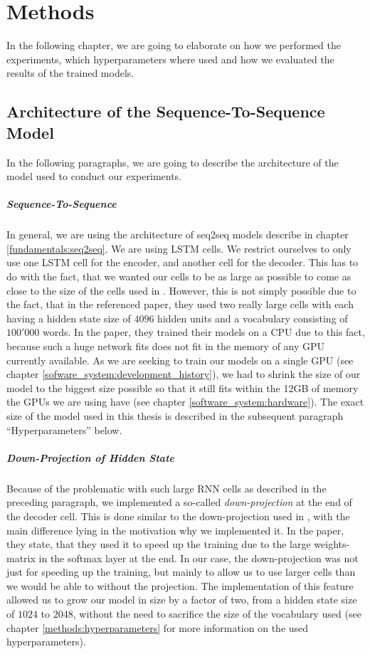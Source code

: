 \chapter{Methods}
\label{methods}
In the following chapter, we are going to elaborate on how we performed the experiments, which hyperparameters where used and how we evaluated the results of the trained models.

\section{Architecture of the Sequence-To-Sequence Model}
In the following paragraphs, we are going to describe the architecture of the model used to conduct our experiments.

\paragraph{Sequence-To-Sequence} In general, we are using the architecture of seq2seq models describe in chapter \ref{fundamentals:seq2seq}. We are using LSTM cells. We restrict ourselves to only use one LSTM cell for the encoder, and another cell for the decoder. This has to do with the fact, that we wanted our cells to be as large as possible to come as close to the size of the cells used in \cite{Vinyals:2015}. However, this is not simply possible due to the fact, that in the referenced paper, they used two really large cells with each having a hidden state size of $4096$ hidden units and a vocabulary consisting of $100'000$ words. In the paper, they trained their models on a CPU due to this fact, because such a huge network fits does not fit in the memory of any GPU currently available. As we are seeking to train our models on a single GPU (see chapter \ref{sofware_system:development_history}), we had to shrink the size of our model to the biggest size possible so that it still fits within the 12GB of memory the GPUs we are using have (see chapter \ref{software_system:hardware}). The exact size of the model used in this thesis is described in the subsequent paragraph ``Hyperparameters'' below.

\paragraph{Down-Projection of Hidden State} Because of the problematic with such large RNN cells as described in the preceding paragraph, we implemented a so-called \emph{down-projection} at the end of the decoder cell. This is done similar to the down-projection used in \cite{Vinyals:2015}, with the main difference lying in the motivation why we implemented it. In the paper, they state, that they used it to speed up the training due to the large weights-matrix in the softmax layer at the end. In our case, the down-projection was not just for speeding up the training, but mainly to allow us to use larger cells than we would be able to without the projection. The implementation of this feature allowed us to grow our model in size by a factor of two, from a hidden state size of $1024$ to $2048$, without the need to sacrifice the size of the vocabulary used (see chapter \ref{methods:hyperparameters} for more information on the used hyperparameters).

